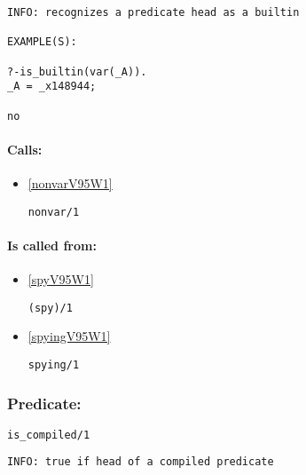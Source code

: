 {\small \begin{verbatim}
INFO: recognizes a predicate head as a builtin

EXAMPLE(S):

?-is_builtin(var(_A)).
_A = _x148944;

no

\end{verbatim}}
\paragraph{Calls:} 
\begin{itemize}
\item \ref{nonvarV95W1} 
\begin{verbatim}
nonvar/1
\end{verbatim}

\end{itemize}
\paragraph{Is called from:} 
\begin{itemize}
\item \ref{spyV95W1} 
\begin{verbatim}
(spy)/1
\end{verbatim}

\item \ref{spyingV95W1} 
\begin{verbatim}
spying/1
\end{verbatim}

\end{itemize}

\subsubsection{Predicate:} \label{isV95WcompiledV95W1}

\begin{verbatim}
is_compiled/1
\end{verbatim}

{\small \begin{verbatim}
INFO: true if head of a compiled predicate

\end{verbatim}}
